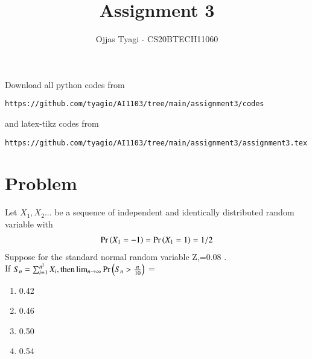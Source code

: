 \documentclass[journal,12pt,twocolumn]{IEEEtran}
\begin{document}
\providecommand{\fourier}{\overset{\mathcal{F}}{ \rightleftharpoons}}
\providecommand{\system}{\overset{\mathcal{H}}{ \longleftrightarrow}}
\newcommand{\solution}{\noindent \textbf{Solution: }}
\newcommand{\cosec}{\,\text{cosec}\,}
\providecommand{\dec}[2]{\ensuremath{\overset{#1}{\underset{#2}{\gtrless}}}}
\newcommand{\myvec}[1]{\ensuremath{\begin{pmatrix}#1\end{pmatrix}}}
\newcommand{\mydet}[1]{\ensuremath{\begin{vmatrix}#1\end{vmatrix}}}
\makeatletter
{}
\makeatother
\let\StandardTheFigure\thefigure
\let\vec\mathbf
\renewcommand{\thefigure}{\theproblem}
\def\putbox#1#2#3{\makebox[0in][l]{\makebox[#1][l]{}\raisebox{\baselineskip}[0in][0in]{\raisebox{#2}[0in][0in]{#3}}}}
     \def\rightbox#1{\makebox[0in][r]{#1}}
     \def\centbox#1{\makebox[0in]{#1}}
     \def\topbox#1{\raisebox{-\baselineskip}[0in][0in]{#1}}
     \def\midbox#1{\raisebox{-0.5\baselineskip}[0in][0in]{#1}}
\vspace{3cm}
\title{Assignment 3}
\author{Ojjas Tyagi - CS20BTECH11060}
\maketitle
\newpage
\bigskip
\renewcommand{\thefigure}{\theenumi}
\renewcommand{\thetable}{\theenumi}
Download all python codes from 
\begin{lstlisting}
https://github.com/tyagio/AI1103/tree/main/assignment3/codes
\end{lstlisting}
%
and latex-tikz codes from 
%
\begin{lstlisting}
https://github.com/tyagio/AI1103/tree/main/assignment3/assignment3.tex
\end{lstlisting}
\section{Problem}
Let \(X_1,X_2\)... be a sequence of independent and identically distributed random variable with
\begin{align}
    \Pr\left(X_1=-1\right)=\Pr\left(X_1=1\right)=1/2
\end{align}
Suppose for the standard normal random variable Z,=0.08 .\\
If \(S_n= \sum_{i=1}^{n^2} X_i ,\text{then} \lim_{n\to\infty} \Pr\left(S_n >\frac{n}{10}\right)\) =
\begin{enumerate}
    \item 0.42
    \item 0.46
    \item 0.50
    \item 0.54
\end{enumerate}
\end{document}
